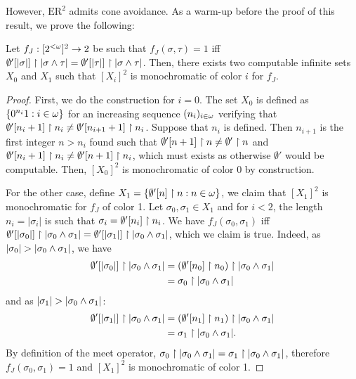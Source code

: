 However, $\mathrm{ER}^2$ admits cone avoidance.
As a warm-up before the proof of this result, we prove the following:
\begin{lemma}\label{le:ER-construction-example}
  Let $f_J:[{2^{<\omega}}]^2\to2$ be such that $f_J(\sigma,\tau)=1$ iff $\emptyset'[|\sigma|]\upharpoonright|\sigma\wedge\tau|=\emptyset'[|\tau|]\upharpoonright|\sigma\wedge\tau|$. Then, there exists two computable infinite sets $X_0$ and $X_1$ such that $[X_i]^2$ is monochromatic of color $i$ for $f_J$.
\end{lemma}
\begin{proof}
  First, we do the construction for $i=0$. The set $X_0$ is defined as $\{0^{n_i}1:i\in\omega\}$ for an increasing sequence $(n_i)_{i\in\omega}$ verifying that $\emptyset'[n_i+1]\upharpoonright n_i\neq \emptyset'[n_{i+1}+1]\upharpoonright n_i$. Suppose that $n_i$ is defined. Then $n_{i+1}$ is the first integer $n>n_i$ found such that $\emptyset'[n+1]\upharpoonright n\neq \emptyset'\upharpoonright n$ and $\emptyset'[n_i+1]\upharpoonright n_i\neq \emptyset'[n+1]\upharpoonright n_i$, which must exists as otherwise $\emptyset'$ would be computable. Then, $[X_0]^2$ is monochromatic of color 0 by construction.


  For the other case, define $X_1=\{\emptyset'[n]\upharpoonright n:n\in\omega\}$, we claim that $[X_1]^2$ is monochromatic for $f_J$ of color 1. Let $\sigma_0,\sigma_1\in X_1$ and for $i<2$, the length $n_i=|\sigma_i|$ is such that $\sigma_i=\emptyset'[n_i]\upharpoonright n_i$. We have $f_J(\sigma_0,\sigma_1)$ iff $\emptyset'[|\sigma_0|]\upharpoonright|\sigma_0\wedge\sigma_1|=\emptyset'[|\sigma_1|]\upharpoonright|\sigma_0\wedge\sigma_1|$, which we claim is true. Indeed, as $|\sigma_0|>|\sigma_0\meet\sigma_1|$, we have
  \begin{equation*}
    \begin{aligned}
      \emptyset'[|\sigma_0|]\upharpoonright|\sigma_0\wedge\sigma_1|  & = (\emptyset'[n_0]\upharpoonright n_0)\upharpoonright|\sigma_0\wedge\sigma_1| \\
       & = \sigma_0\upharpoonright|\sigma_0\wedge\sigma_1|
    \end{aligned}
  \end{equation*}
  and as $|\sigma_1|>|\sigma_0\meet\sigma_1|$:
  \begin{equation*}
    \begin{aligned}
      \emptyset'[|\sigma_1|]\upharpoonright|\sigma_0\wedge\sigma_1|  & = (\emptyset'[n_1]\upharpoonright n_1)\upharpoonright|\sigma_0\wedge\sigma_1| \\
       & = \sigma_1\upharpoonright|\sigma_0\wedge\sigma_1|.
    \end{aligned}
  \end{equation*}
  By definition of the meet operator, $\sigma_0\upharpoonright|\sigma_0\wedge\sigma_1|=\sigma_1\upharpoonright|\sigma_0\wedge\sigma_1|$, therefore $f_J(\sigma_0,\sigma_1)=1$ and $[X_1]^2$ is monochromatic of color 1.
\end{proof}


